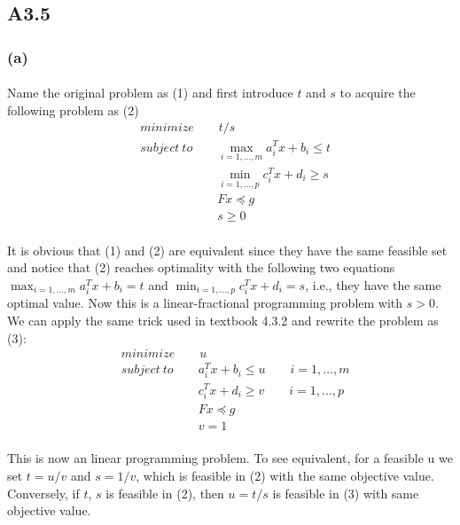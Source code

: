 \subsection*{A3.5}
\subsubsection*{(a)}
\paragraph{}
Name the original problem as (1) and first introduce $t$ and $s$ to acquire the following problem as (2)
\begin{align*}
&minimize \qquad t/s \\
&subject \ to \qquad   \max_{i=1,...,m}a^T_ix+b_i \leq t \\
&\qquad \qquad \qquad \ \min_{i=1,...,p}c^T_ix+d_i \geq s \\
&\qquad \qquad \qquad \ Fx \preceq g \\
&\qquad \qquad \qquad \ s \geq 0
\end{align*}
\paragraph{}
It is obvious that (1) and (2) are equivalent since they have the same feasible set and notice that (2) reaches optimality with the following two equations $\max_{i=1,...,m}a^T_ix+b_i = t $ and $\min_{i=1,...,p}c^T_ix+d_i =s$, i.e., they have the same optimal value. Now this is a linear-fractional programming problem with $s > 0$. We can apply the same trick used in textbook 4.3.2 and rewrite the problem as (3):
\begin{align*}
&minimize \qquad u \\
&subject \ to \qquad   a^T_ix+b_i \leq u \qquad i=1,...,m\\
&\qquad \qquad \qquad \ c^T_ix+d_i \geq v \qquad i=1,...,p\\
&\qquad \qquad \qquad \ Fx \preceq g \\
&\qquad \qquad \qquad \ v=1
\end{align*}
\paragraph{}
This is now an linear programming problem. To see equivalent, for a feasible u we set $t = u/v$ and $s = 1/v$, which is feasible in (2) with the same objective value. Conversely, if $t$, $s$ is feasible in (2), then $u=t/s$ is feasible in (3) with same objective value.